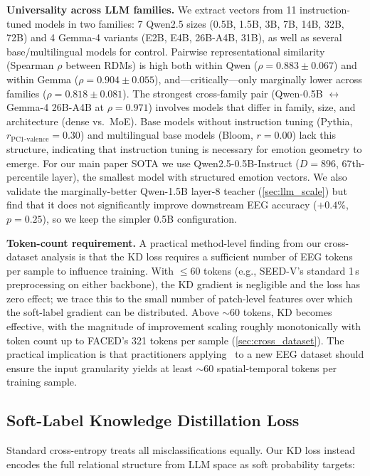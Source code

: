 \noindent\textbf{Universality across LLM families.} We extract vectors from 11 instruction-tuned models in two families: 7 Qwen2.5 sizes (0.5B, 1.5B, 3B, 7B, 14B, 32B, 72B) and 4 Gemma-4 variants (E2B, E4B, 26B-A4B, 31B), as well as several base/multilingual models for control. Pairwise representational similarity (Spearman $\rho$ between RDMs) is high both within Qwen ($\rho = 0.883 \pm 0.067$) and within Gemma ($\rho = 0.904 \pm 0.055$), and---critically---only marginally lower across families ($\rho = 0.818 \pm 0.081$). The strongest cross-family pair (Qwen-0.5B $\leftrightarrow$ Gemma-4 26B-A4B at $\rho = 0.971$) involves models that differ in family, size, and architecture (dense vs.\ MoE). Base models without instruction tuning (Pythia, $r_{\text{PC1-valence}} = 0.30$) and multilingual base models (Bloom, $r = 0.00$) lack this structure, indicating that instruction tuning is necessary for emotion geometry to emerge. For our main paper SOTA we use Qwen2.5-0.5B-Instruct ($D = 896$, 67th-percentile layer), the smallest model with structured emotion vectors. We also validate the marginally-better Qwen-1.5B layer-8 teacher (\cref{sec:llm_scale}) but find that it does not significantly improve downstream EEG accuracy ($+0.4\%$, $p = 0.25$), so we keep the simpler 0.5B configuration.

\noindent\textbf{Token-count requirement.} A practical method-level finding from our cross-dataset analysis is that the KD loss requires a sufficient number of EEG tokens per sample to influence training. With $\leq$60 tokens (e.g., SEED-V's standard 1\,s preprocessing on either backbone), the KD gradient is negligible and the loss has zero effect; we trace this to the small number of patch-level features over which the soft-label gradient can be distributed. Above $\sim$60 tokens, KD becomes effective, with the magnitude of improvement scaling roughly monotonically with token count up to FACED's 321 tokens per sample (\cref{sec:cross_dataset}). The practical implication is that practitioners applying \ours\ to a new EEG dataset should ensure the input granularity yields at least $\sim$60 spatial-temporal tokens per training sample.

\subsection{Soft-Label Knowledge Distillation Loss}
\label{sec:kd_loss}
\vspace{-1mm}

Standard cross-entropy treats all misclassifications equally. Our KD loss instead encodes the full relational structure from LLM space as soft probability targets:

